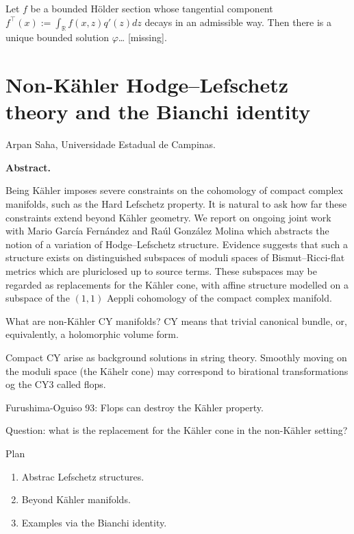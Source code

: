 \begin{theorem}
\label{theorem-bdpg2}
Let $f$ be a bounded Hölder
section whose tangential component
$f^\top(x):= \int_{\mathbb{R}}f(x,z)
q'(z)dz$ decays in an admissible way.
Then there is a unique bounded solution
$\varphi$… [missing].
\end{theorem}

\section{Non-K\"ahler Hodge--Lefschetz
theory and the Bianchi identity}
\label{section-non-kahler-hodge-lefschetz}

\medskip\noindent
Arpan Saha,
Universidade Estadual de Campinas.

\medskip\noindent
{\bf Abstract.}

Being K\"ahler imposes severe constraints
on the cohomology of compact complex
manifolds, such as the Hard Lefschetz
property. It is natural to ask how far
these constraints extend beyond K\"ahler
geometry. We report on ongoing joint work
with Mario Garc\'ia Fern\'andez and Ra\'ul
Gonz\'alez Molina which abstracts the
notion of a variation of Hodge--Lefschetz
structure. Evidence suggests that such a
structure exists on distinguished
subspaces of moduli spaces of
Bismut--Ricci-flat metrics which are
pluriclosed up to source terms. These
subspaces may be regarded as replacements
for the K\"ahler cone, with affine
structure modelled on a subspace of the
$(1,1)$ Aeppli cohomology of the compact
complex manifold.

\medskip\noindent
What are non-Kähler CY manifolds?
CY means that trivial canonical bundle,
or, equivalently, a holomorphic volume form.

Compact CY arise as background solutions in
string theory.
Smoothly moving on the moduli space (the
Kähelr cone) may correspond to birational
transformations og the CY3 called flops.

Furushima-Oguiso 93: Flops can destroy
the Kähler property.

Question: what is the replacement for the
Kähler cone in the non-Kähler setting?

\medskip\noindent
Plan
\begin{enumerate}
\item Abstrac Lefschetz structures.
\item Beyond Kähler manifolds.
\item Examples via the Bianchi
identity.
\end{enumerate}

